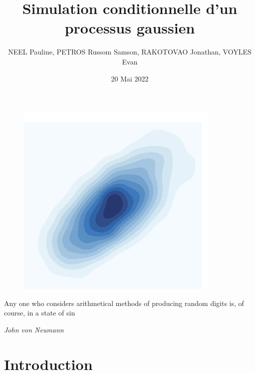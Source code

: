\documentclass[10pt]{article} %
\title{Simulation conditionnelle d'un processus gaussien}
\author{NEEL Pauline, PETROS Russom Samson, RAKOTOVAO Jonathan, VOYLES Evan}
\date{20 Mai 2022}
\begin{document}
\begin{titlepage}

\maketitle

\begin{figure}[h!]
    \centering
    \includegraphics{media/plot.png}
\end{figure}

\vspace{3cm}





\epigraph{Any one who considers arithmetical methods of producing random digits is, of course, in a state of sin}
 {\textit{John von Neumann}}

\newpage

\end{titlepage}

\pagestyle{fancy}

\tableofcontents

\newpage

\section{Introduction}
\end{document}
